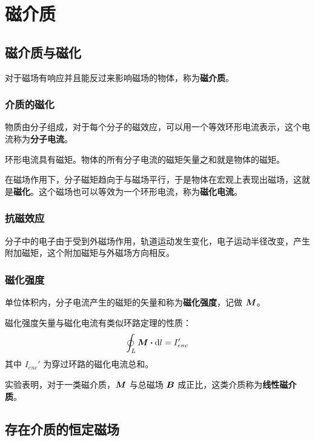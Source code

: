 \section{磁介质}

\subsection{磁介质与磁化}

对于磁场有响应并且能反过来影响磁场的物体，称为\textbf{磁介质}。

\subsubsection{介质的磁化}

物质由分子组成，对于每个分子的磁效应，可以用一个等效环形电流表示，这个电流称为\textbf{分子电流}。

环形电流具有磁矩。物体的所有分子电流的磁矩矢量之和就是物体的磁矩。

在磁场作用下，分子磁矩趋向于与磁场平行，于是物体在宏观上表现出磁场，这就是\textbf{磁化}。这个磁场也可以等效为一个环形电流，称为\textbf{磁化电流}。

\subsubsection{抗磁效应}

分子中的电子由于受到外磁场作用，轨道运动发生变化，电子运动半径改变，产生附加磁矩，这个附加磁矩与外磁场方向相反。

\subsubsection{磁化强度}

\begin{definition}[磁化强度]
	单位体积内，分子电流产生的磁矩的矢量和称为\textbf{磁化强度}，记做 $\boldsymbol{M}$。
\end{definition}

磁化强度矢量与磁化电流有类似环路定理的性质：
$$
\oint_L \vect{M} \vdot \dd{l} = I_{enc}'
$$
其中 $I_{enc}'$ 为穿过环路的磁化电流总和。

实验表明，对于一类磁介质，$\boldsymbol{M}$ 与总磁场 $\boldsymbol{B}$ 成正比，这类介质称为\textbf{线性磁介质}。

\subsection{存在介质的恒定磁场}

